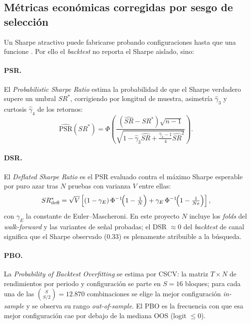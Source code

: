\documentclass[11pt,a4paper]{article}
\begin{document}
\subsection{Métricas económicas corregidas por sesgo de selección}
\label{ap:metricas-fin}
Un Sharpe atractivo puede fabricarse probando configuraciones hasta que una
funcione \cite{white2000reality,harvey2015backtesting}. Por ello el
\emph{backtest} no reporta el Sharpe \cite{sharpe1994ratio} aislado, sino:

\paragraph{PSR.} El \emph{Probabilistic Sharpe Ratio} \cite{bailey2012sharpe}
estima la probabilidad de que el Sharpe verdadero supere un umbral $SR^{*}$,
corrigiendo por longitud de muestra, asimetría $\hat\gamma_3$ y curtosis
$\hat\gamma_4$ de los retornos:
\begin{equation}
\widehat{\mathrm{PSR}}(SR^{*}) =
\Phi\!\left(\frac{(\widehat{SR}-SR^{*})\sqrt{n-1}}
{\sqrt{1-\hat\gamma_3\widehat{SR}+\frac{\hat\gamma_4-1}{4}\widehat{SR}^2}}\right).
\end{equation}

\paragraph{DSR.} El \emph{Deflated Sharpe Ratio} \cite{bailey2014deflated} es el
PSR evaluado contra el máximo Sharpe esperable por puro azar tras $N$ pruebas
con varianza $V$ entre ellas:
\begin{equation}
SR^{*}_{\mathrm{defl}} = \sqrt{V}\left[(1-\gamma_E)\,\Phi^{-1}\!\Bigl(1-\tfrac{1}{N}\Bigr)
 + \gamma_E\,\Phi^{-1}\!\Bigl(1-\tfrac{1}{Ne}\Bigr)\right],
\end{equation}
con $\gamma_E$ la constante de Euler--Mascheroni. En este proyecto $N$ incluye
los \emph{folds} del \emph{walk-forward} y las variantes de señal probadas; el
DSR $\approx 0$ del \emph{backtest} de canal significa que el Sharpe observado
(0.33) es plenamente atribuible a la búsqueda.

\paragraph{PBO.} La \emph{Probability of Backtest Overfitting}
\cite{bailey2017probability} se estima por CSCV: la matriz $T\times N$ de
rendimientos por periodo y configuración se parte en $S=16$ bloques; para cada
una de las $\binom{S}{S/2}=12.870$ combinaciones se elige la mejor configuración
\emph{in-sample} y se observa su rango \emph{out-of-sample}. El PBO es la
frecuencia con que esa mejor configuración cae por debajo de la mediana OOS
(logit $\leq 0$).
\end{document}
